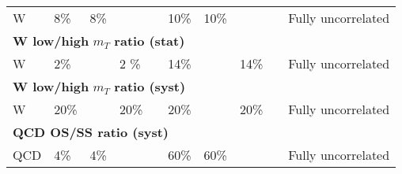 \begin{table}[!h]
\begin{center}
{\begin{tabular}{p{2cm}|p{1cm}p{1cm}p{1cm}p{1cm}|p{1cm}p{1cm}p{1cm}p{1cm}|p{3cm}}
    W & 8\% & 8\% & & &10\% &10\% & & &Fully uncorrelated \\
    \multicolumn{10}{l}{\textbf{W low/high} $m_{T}$ \textbf{ratio (stat)}}\\
    W & 2\% & & 2 \% & &14\% & & 14\% & & Fully uncorrelated \\
    \multicolumn{10}{l}{\textbf{W low/high} $m_{T}$ \textbf{ratio (syst)} }\\
    W & 20\% & &20\% & & 20\% & & 20\% & & Fully uncorrelated \\
    \multicolumn{10}{l}{\textbf{QCD OS/SS ratio (syst) }}\\
    QCD & 4\% & 4\% & & & 60\% & 60\% & & &Fully uncorrelated \\
    \hline
\end{tabular}
}
\label{tab:SystematicUncertainties_mt}
\end{center}
\end{table}


